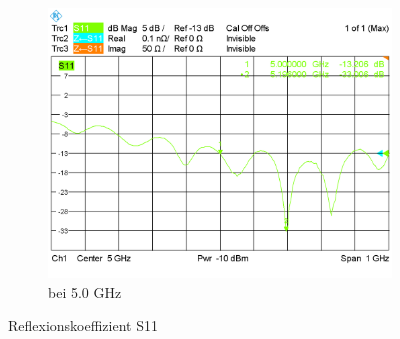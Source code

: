\begin{figure}[h!]
\begin{center}
\begin{subfigure}[t]{0.49\textwidth}
\begin{center}
				\includegraphics[width=1\textwidth]{../fig/plt/S11_WITH_5_0.PNG}
				\caption{bei 5.0 GHz}
				\label{fig:S11_with_full_5.0}
			\end{center}
		\end{subfigure}
		\caption{Reflexionskoeffizient S11}
		\label{fig:S11_each}
	\end{center}
\end{figure}

